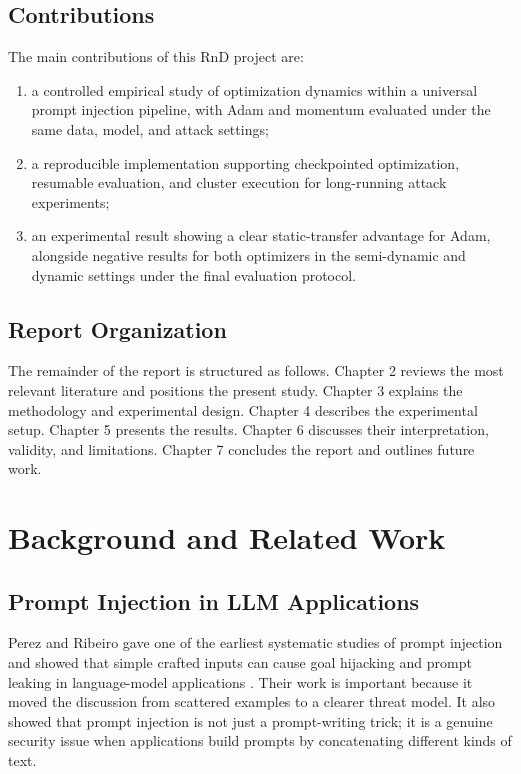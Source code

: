 \documentclass[12pt,a4paper]{report}
\begin{document}
\section{Contributions}
The main contributions of this RnD project are:
\begin{enumerate}[label=\arabic*.]
\item a controlled empirical study of optimization dynamics within a universal prompt injection pipeline, with Adam and momentum evaluated under the same data, model, and attack settings;
\item a reproducible implementation supporting checkpointed optimization, resumable evaluation, and cluster execution for long-running attack experiments;
\item an experimental result showing a clear static-transfer advantage for Adam, alongside negative results for both optimizers in the semi-dynamic and dynamic settings under the final evaluation protocol.
\end{enumerate}

\section{Report Organization}
The remainder of the report is structured as follows. Chapter 2 reviews the most relevant literature and positions the present study. Chapter 3 explains the methodology and experimental design. Chapter 4 describes the experimental setup. Chapter 5 presents the results. Chapter 6 discusses their interpretation, validity, and limitations. Chapter 7 concludes the report and outlines future work.

\chapter{Background and Related Work}
\section{Prompt Injection in LLM Applications}
Perez and Ribeiro gave one of the earliest systematic studies of prompt injection and showed that simple crafted inputs can cause goal hijacking and prompt leaking in language-model applications \cite{perez2022promptinject}. Their work is important because it moved the discussion from scattered examples to a clearer threat model. It also showed that prompt injection is not just a prompt-writing trick; it is a genuine security issue when applications build prompts by concatenating different kinds of text.
\end{document}
